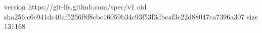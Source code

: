 version https://git-lfs.github.com/spec/v1
oid sha256:c6e941dc40af5256f8f8cbc16059b34c93f53f3dbcaf3c22d88047ca7396a307
size 131168
